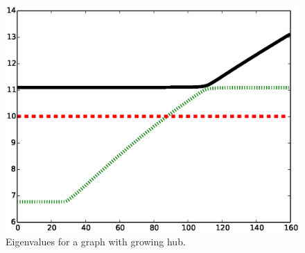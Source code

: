 \documentclass[twocolumn,prl,superscriptaddress]{revtex4}
\begin{document}

\cite{hashimoto89, nadakuditi13, krzakala13, chung03}

\begin{figure}
\begin{center}
\includegraphics[width=\columnwidth]{eig.eps}
\end{center}
\caption{Eigenvalues for a graph with growing hub.}
\label{fig:evalues}
\end{figure}
\end{document}
